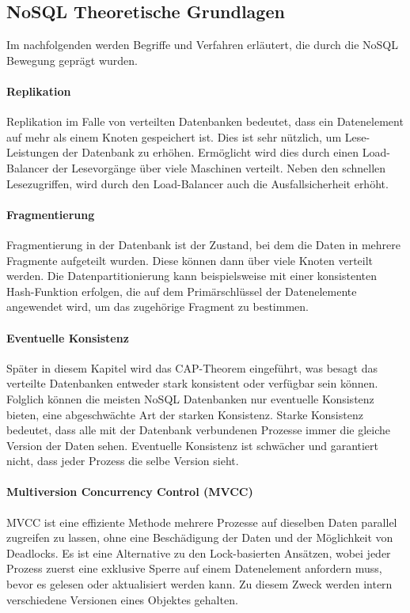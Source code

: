 \subsection{NoSQL Theoretische Grundlagen}
\label{ch:grundlagen:sec:NoSQL:NoSQLBasics}

Im nachfolgenden werden Begriffe und Verfahren erläutert, die durch die NoSQL Bewegung geprägt wurden.

\paragraph{Replikation} Replikation im Falle von verteilten Datenbanken bedeutet, dass ein Datenelement auf mehr als einem Knoten gespeichert ist. Dies ist sehr nützlich, um Lese-Leistungen der Datenbank zu erhöhen. Ermöglicht wird dies durch einen Load-Balancer der Lesevorgänge über viele Maschinen verteilt. Neben den schnellen Lesezugriffen, wird durch den Load-Balancer auch die Ausfallsicherheit erhöht.  

\paragraph{Fragmentierung} Fragmentierung in der Datenbank ist der Zustand, bei dem die Daten in mehrere Fragmente aufgeteilt wurden. Diese können dann über viele Knoten verteilt werden. Die Datenpartitionierung kann beispielsweise mit einer konsistenten Hash-Funktion erfolgen, die auf dem Primärschlüssel der Datenelemente angewendet wird, um das zugehörige Fragment zu bestimmen.

\paragraph{Eventuelle Konsistenz} Später in diesem Kapitel wird das CAP-Theorem eingeführt, was besagt das verteilte Datenbanken entweder stark konsistent oder verfügbar sein können. Folglich können die meisten NoSQL Datenbanken nur eventuelle Konsistenz bieten, eine abgeschwächte Art der starken Konsistenz. Starke Konsistenz bedeutet, dass alle mit der Datenbank verbundenen Prozesse immer die gleiche Version der Daten sehen. Eventuelle Konsistenz ist schwächer und garantiert nicht, dass jeder Prozess die selbe Version sieht.

\paragraph{Multiversion Concurrency Control (MVCC)} MVCC ist eine effiziente Methode mehrere Prozesse auf dieselben Daten parallel zugreifen zu lassen, ohne eine Beschädigung der Daten und der Möglichkeit von Deadlocks. Es ist eine Alternative zu den Lock-basierten Ansätzen, wobei jeder Prozess zuerst eine exklusive Sperre auf einem Datenelement anfordern muss, bevor es gelesen oder aktualisiert werden kann. Zu diesem Zweck werden intern verschiedene Versionen eines Objektes gehalten.

